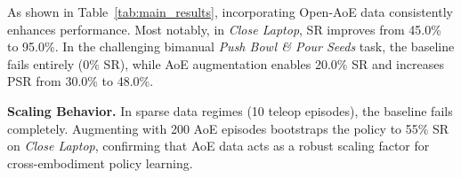 \begin{table}[h]
\centering
\caption{Real-world task performance. SR = Success Rate, PSR = Phase-wise Success Rate. ``+200 AoE'' augments the 50 teleoperation baseline with 200 Open-AoE demonstrations per task.}
\label{tab:main_results}
\end{table}

As shown in Table~\ref{tab:main_results}, incorporating Open-AoE data consistently enhances performance. Most notably, in \textit{Close Laptop}, SR improves from 45.0\% to 95.0\%. In the challenging bimanual \textit{Push Bowl \& Pour Seeds} task, the baseline fails entirely (0\% SR), while AoE augmentation enables 20.0\% SR and increases PSR from 30.0\% to 48.0\%.

\textbf{Scaling Behavior.} In sparse data regimes (10 teleop episodes), the baseline fails completely. Augmenting with 200 AoE episodes bootstraps the policy to 55\% SR on \textit{Close Laptop}, confirming that AoE data acts as a robust scaling factor for cross-embodiment policy learning.
